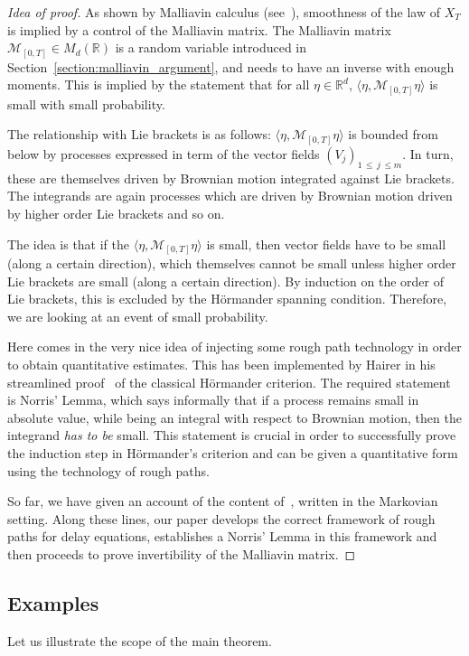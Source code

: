 \documentclass[11pt]{article}
\theoremstyle{definition}
\newcommand{\Mc}{\mathcal{M}}
\numberwithin{equation}{section}
\numberwithin{figure}{section}
\numberwithin{table}{section}
\newcommand*\R{\mathbb{R}}
\newcommand{\Mcal}{\mathcal{M}}%
\begin{document}
\begin{proof}[Idea of proof]
As shown by Malliavin calculus (see~\cite{Nualart2006}), smoothness of the law of $X_T$ is implied by a control of the Malliavin matrix. The Malliavin matrix ${\mathcal{M}}_{[0,T]} \in M_d(\R)$ is a random variable introduced in Section~\ref{section:malliavin_argument}, and needs to have an inverse with enough moments. This is implied by the statement that for all $\eta \in \R^d$, $\langle \eta, \Mcal_{[0,T]} \eta \rangle$ is small with small probability.

The relationship with Lie brackets is as follows: $\langle \eta, \Mcal_{[0,T]} \eta \rangle$ is bounded from below by processes expressed in term of the vector fields $\left(V_j \right)_{1\,\leq\,j\,\leq m}$. In turn, these are themselves driven by Brownian motion integrated against Lie brackets. The integrands are again processes which are driven by Brownian motion driven by higher order Lie brackets and so on.

The idea is that if the $\langle \eta, \Mcal_{[0,T]} \eta \rangle$ is small, then vector fields have to be small (along a certain direction), which themselves cannot be small unless higher order Lie brackets are small (along a certain direction). By induction on the order of Lie brackets, this is excluded by the H\"ormander spanning condition. Therefore, we are looking at an event of small probability.

Here comes in the very nice idea of injecting some rough path technology in order to obtain quantitative estimates. This has been implemented by Hairer in his streamlined proof~\cite{Hairer11} of the classical H\"ormander criterion. The required statement is Norris' Lemma, which says informally that if a process remains small in absolute value, while being an integral with respect to Brownian motion, then the integrand \emph{has to be} small. This statement is crucial in order to successfully prove the induction step in H\"ormander's criterion and can be given a quantitative form using the technology of rough paths.

So far, we have given an account of the content of~\cite{Hairer11}, written in the Markovian setting. Along these lines, our paper develops the correct framework of rough paths for delay equations, establishes a Norris' Lemma in this framework and then proceeds to prove invertibility of the Malliavin matrix.
\end{proof}


\subsection{Examples}\label{subsection:examples}
Let us illustrate the scope of the main theorem.
\end{document}
